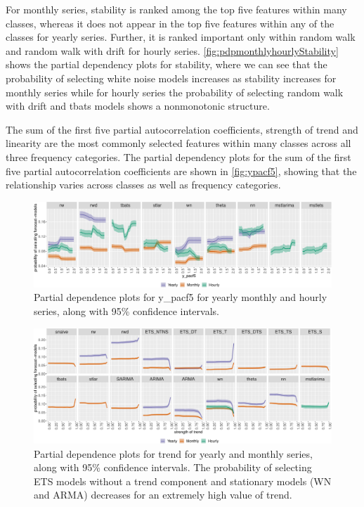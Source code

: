 \documentclass[11pt,a4paper,]{article}
\begin{document}
For monthly series, stability is ranked among the top five features within many classes, whereas it does not appear in the top five features within any of the classes for yearly series. Further, it is ranked important only within random walk and random walk with drift for hourly series. \autoref{fig:pdpmonthlyhourlyStability} shows the partial dependency plots for stability, where we can see that the probability of selecting white noise models increases as stability increases for monthly series while for hourly series the probability of selecting random walk with drift and tbats models shows a nonmonotonic structure.

The sum of the first five partial autocorrelation coefficients, strength of trend and linearity are the most commonly selected features within many classes across all three frequency categories. The partial dependency plots for the sum of the first five partial autocorrelation coefficients are shown in \autoref{fig:ypacf5}, showing that the relationship varies across classes as well as frequency categories.

\begin{figure}[!tbp]

{\centering \includegraphics[width=\textwidth]{figure/ypacf5-1} 

}

\caption{Partial dependence plots for y\_pacf5 for yearly monthly and hourly series, along with 95\% confidence intervals.}\label{fig:ypacf5}
\end{figure}

\begin{figure}[!tbp]

{\centering \includegraphics[width=\textwidth]{figure/pdpyearlytrend-1} 

}

\caption{Partial dependence plots for trend for yearly and monthly series, along with 95\% confidence intervals. The probability of selecting ETS models without a trend component and stationary models (WN and ARMA) decreases for an extremely high value of trend.}\label{fig:pdpyearlytrend}
\end{figure}
\end{document}
